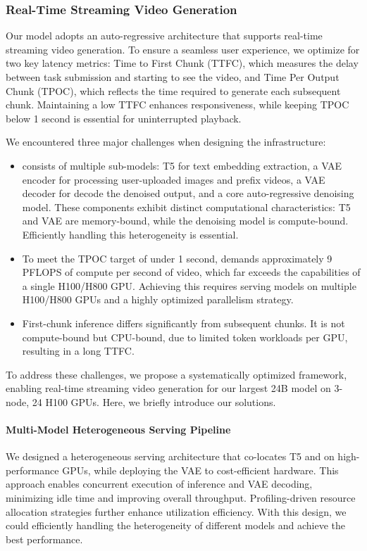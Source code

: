 \subsubsection{Real-Time Streaming Video Generation}
\label{sec:real_time_infra}
Our model adopts an auto-regressive architecture that supports real-time streaming video generation. To ensure a seamless user experience, we optimize for two key latency metrics: Time to First Chunk (TTFC), which measures the delay between task submission and starting to see the video, and Time Per Output Chunk (TPOC), which reflects the time required to generate each subsequent chunk. Maintaining a low TTFC enhances responsiveness, while keeping TPOC below 1 second is essential for uninterrupted playback.

We encountered three major challenges when designing the infrastructure:

\begin{itemize} \item \magi consists of multiple sub-models: T5 for text embedding extraction, a VAE encoder for processing user-uploaded images and prefix videos, a VAE decoder for decode the denoised output, and a core auto-regressive denoising model. These components exhibit distinct computational characteristics: T5 and VAE are memory-bound, while the denoising model is compute-bound. Efficiently handling this heterogeneity is essential.

\item To meet the TPOC target of under 1 second, \magi demands approximately 9 PFLOPS of compute per second of video, which far exceeds the capabilities of a single H100/H800 GPU. Achieving this requires serving models on multiple H100/H800 GPUs and a highly optimized parallelism strategy.

\item First-chunk inference differs significantly from subsequent chunks. It is not compute-bound but CPU-bound, due to limited token workloads per GPU, resulting in a long TTFC. 
\end{itemize}

To address these challenges, we propose a systematically optimized framework, enabling real-time streaming video generation for our largest 24B \magi model on 3-node, 24 H100 GPUs. Here, we briefly introduce our solutions.

\paragraph{Multi-Model Heterogeneous Serving Pipeline}
We designed a heterogeneous serving architecture that co-locates T5 and \magi on high-performance GPUs, while deploying the VAE to cost-efficient hardware. This approach enables concurrent execution of \magi inference and VAE decoding, minimizing idle time and improving overall throughput. Profiling-driven resource allocation strategies further enhance utilization efficiency. With this design, we could efficiently handling the heterogeneity of different models and achieve the best performance. 

